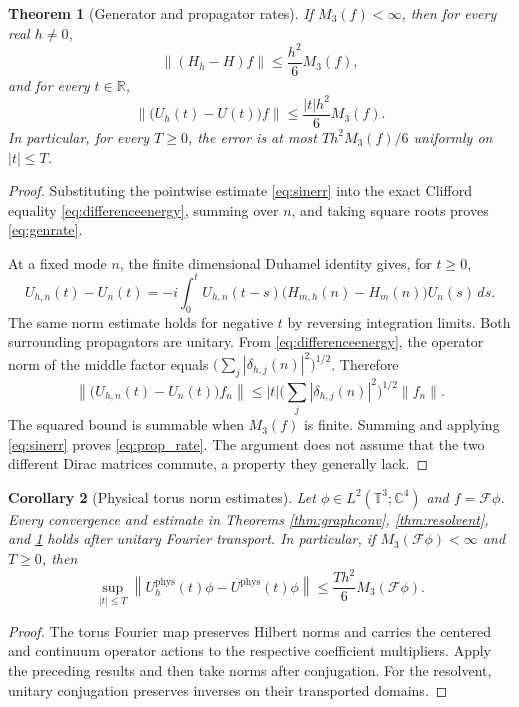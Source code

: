 \documentclass[11pt,oneside]{article}
\theoremstyle{kol}
\newtheorem{theorem}{Theorem}[section]
\newtheorem{corollary}[theorem]{Corollary}
\theoremstyle{definition}
\newcommand{\T}{\mathbb T}
\newcommand{\C}{\mathbb C}
\newcommand{\R}{\mathbb R}
\newcommand{\pp}[1]{\left\lVert#1\right\rVert}
\begin{document}
\begin{theorem}[Generator and propagator rates]\label{thm:rate}
If $M_3(f)<\infty$, then for every real $h\ne0$,
\begin{equation}\label{eq:genrate}
\pp{(H_h-H)f}\le\frac{h^2}{6}M_3(f),
\end{equation}
and for every $t\in\R$,
\begin{equation}\label{eq:prop_rate}
\pp{\big(U_h(t)-U(t)\big)f}\le\frac{|t|h^2}{6}M_3(f).
\end{equation}
In particular, for every $T\ge0$, the error is at most $Th^2M_3(f)/6$ uniformly on $|t|\le T$.
\end{theorem}
\begin{proof}
Substituting the pointwise estimate \eqref{eq:sinerr} into the exact Clifford equality \eqref{eq:differenceenergy}, summing over $n$, and taking square roots proves \eqref{eq:genrate}.

At a fixed mode $n$, the finite dimensional Duhamel identity gives, for $t\ge0$,
\[
U_{h,n}(t)-U_n(t)
=-i\int_0^t U_{h,n}(t-s)\big(H_{m,h}(n)-H_m(n)\big)U_n(s)\,ds.
\]
The same norm estimate holds for negative $t$ by reversing integration limits. Both surrounding propagators are unitary. From \eqref{eq:differenceenergy}, the operator norm of the middle factor equals $\big(\sum_j|\delta_{h,j}(n)|^2\big)^{1/2}$. Therefore
\[
\pp{\big(U_{h,n}(t)-U_n(t)\big)f_n}
\le |t|\bigg(\sum_j|\delta_{h,j}(n)|^2\bigg)^{1/2}\pp{f_n}.
\]
The squared bound is summable when $M_3(f)$ is finite. Summing and applying \eqref{eq:sinerr} proves \eqref{eq:prop_rate}. The argument does not assume that the two different Dirac matrices commute, a property they generally lack.
\end{proof}

\begin{corollary}[Physical torus norm estimates]\label{cor:physicalrates}
Let $\phi\in L^2(\T^3;\C^4)$ and $f=\mathcal F\phi$. Every convergence and estimate in Theorems \ref{thm:graphconv}, \ref{thm:resolvent}, and \ref{thm:rate} holds after unitary Fourier transport. In particular, if $M_3(\mathcal F\phi)<\infty$ and $T\ge0$, then
\[
\sup_{|t|\le T}\pp{U_h^{\mathrm{phys}}(t)\phi-U^{\mathrm{phys}}(t)\phi}
\le \frac{Th^2}{6}M_3(\mathcal F\phi).
\]
\end{corollary}
\begin{proof}
The torus Fourier map preserves Hilbert norms and carries the centered and continuum operator actions to the respective coefficient multipliers. Apply the preceding results and then take norms after conjugation. For the resolvent, unitary conjugation preserves inverses on their transported domains.
\end{proof}
\end{document}
